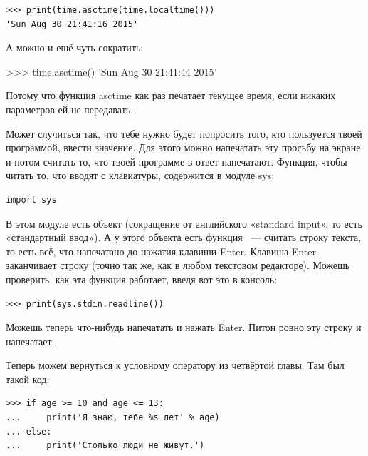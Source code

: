 \begin{listing}
\begin{verbatim}
>>> print(time.asctime(time.localtime()))
'Sun Aug 30 21:41:16 2015'
\end{verbatim}
\end{listing}

А можно и ещё чуть сократить:

\begin{listing}
>>> time.asctime()
'Sun Aug 30 21:41:44 2015'
\end{listing}

Потому что функция asctime как раз печатает текущее время, если никаких параметров ей не передавать.

Может случиться так, что тебе нужно будет попросить того, кто пользуется твоей программой, ввести значение. Для этого можно напечатать эту просьбу на экране и потом считать то, что твоей программе в ответ напечатают. Функция, чтобы читать то, что вводят с клавиатуры, содержится в модуле sys:

\begin{listing}
\begin{verbatim}
import sys
\end{verbatim}
\end{listing}

В этом модуле есть объект  (сокращение от английского «standard input», то есть «стандартный ввод»). А у этого объекта есть функция  — считать строку текста, то есть всё, что напечатано до нажатия клавиши Enter. Клавиша Enter заканчивает строку (точно так же, как в любом текстовом редакторе). Можешь проверить, как эта функция работает, введя вот это в консоль:

\begin{listing}
\begin{verbatim}
>>> print(sys.stdin.readline())
\end{verbatim}
\end{listing}

Можешь теперь что-нибудь напечатать и нажать Enter. Питон ровно эту строку и напечатает.

Теперь можем вернуться к условному оператору  из четвёртой главы. Там был такой код:

\begin{listing}
\begin{verbatim}
>>> if age >= 10 and age <= 13:
...     print('Я знаю, тебе %s лет' % age)
... else:
...     print('Столько люди не живут.')
\end{verbatim}
\end{listing}

